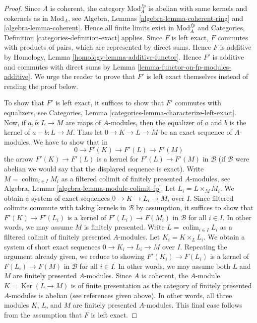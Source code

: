 \documentclass{stacks-project}
\theoremstyle{plain}
\theoremstyle{definition}
\theoremstyle{remark}
\numberwithin{equation}{subsection}
\def\colim{\mathop{\mathrm{colim}}\nolimits}
\def\Ker{\mathop{\mathrm{Ker}}}
\begin{document}
\begin{proof}
Since $A$ is coherent, the category $\text{Mod}^{fp}_A$ is abelian
with same kernels and cokernels as in $\text{Mod}_A$, see
Algebra, Lemmas \ref{algebra-lemma-coherent-ring} and
\ref{algebra-lemma-coherent}. Hence all finite limits exist in
$\text{Mod}^{fp}_A$ and
Categories, Definition \ref{categories-definition-exact} applies.
Since $F$ is left exact, $F$ commutes with products of pairs, which are
represented by direct sums. Hence $F$ is additive by
Homology, Lemma \ref{homology-lemma-additive-functor}.
Hence $F'$ is additive and commutes with direct sums by
Lemma \ref{lemma-functor-on-fp-modules-additive}.
We urge the reader to prove that $F'$ is left exact themselves
instead of reading the proof below.

\medskip\noindent
To show that $F'$ is left exact, it suffices to show that $F'$ commutes
with equalizers, see
Categories, Lemma \ref{categories-lemma-characterize-left-exact}.
Now, if $a, b : L \to M$ are maps of $A$-modules, then the
equalizer of $a$ and $b$ is the kernel of $a - b : L \to M$.
Thus let $0 \to K \to L \to M$ be an exact sequence
of $A$-modules. We have to show that in
$$
0 \to F'(K) \to F'(L) \to F'(M)
$$
the arrow $F'(K) \to F'(L)$ is a kernel for $F'(L) \to F'(M)$ in $\mathcal{B}$
(if $\mathcal{B}$ were abelian we would say that the displayed sequence
is exact).
Write $M = \colim_{i \in I} M_i$ as a filtered colimit of finitely
presented $A$-modules, see
Algebra, Lemma \ref{algebra-lemma-module-colimit-fp}.
Let $L_i = L \times_M M_i$. 
We obtain a system of exact sequences $0 \to K \to L_i \to M_i$
over $I$. Since filtered colimits commute with taking kernels
in $\mathcal{B}$ by assumption, 
it suffices to show that $F'(K) \to F'(L_i)$ is a kernel of
$F'(L_i) \to F(M_i)$ in $\mathcal{B}$ for all $i \in I$. In other words, we may
assume $M$ is finitely presented. Write $L = \colim_{i \in I} L_i$
as a filtered colimit of finitely presented $A$-modules.
Let $K_i = K \times_L L_i$. We obtain a system of short exact sequences
$0 \to K_i \to L_i \to M$ over $I$.
Repeating the argument already given, we reduce to showing
$F'(K_i) \to F(L_i)$ is a kernel of
$F(L_i) \to F(M)$ in $\mathcal{B}$ for all $i \in I$.
In other words, we may assume both
$L$ and $M$ are finitely presented $A$-modules.
Since $A$ is coherent, the $A$-module $K = \Ker(L \to M)$ is
of finite presentation as the category of finitely presented
$A$-modules is abelian (see references given above).
In other words, all three modules $K$, $L$, and $M$
are finitely presented $A$-modules. This final case follows
from the assumption that $F$ is left exact.
\end{proof}
\end{document}
